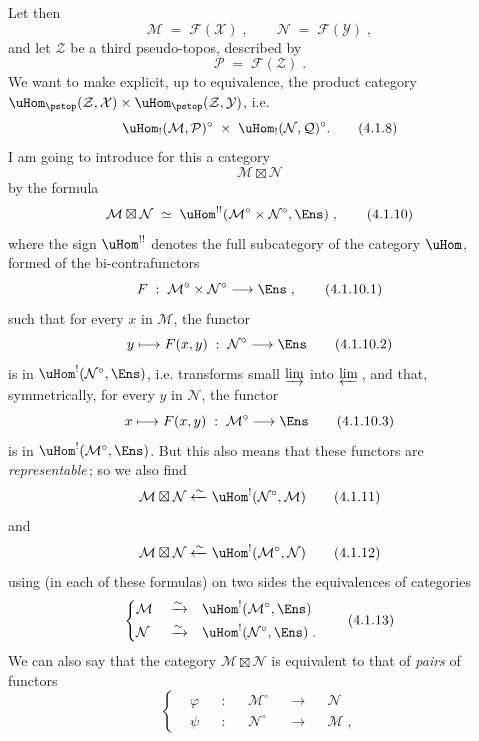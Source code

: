Let then
\[
\mathcal{M} \;=\; \mathcal{F}(\mathcal{X})\;, \qquad \mathcal{N} \;=\; \mathcal{F}(\mathcal{Y})\;,
\tag*{(4.1.6)}
\]
and let $\mathcal{Z}$ be a third pseudo-topos, described by
\[
\mathcal{P} \;=\; \mathcal{F}(\mathcal{Z})\;.
\tag*{(4.1.7)}
\]
We want to make explicit, up to equivalence, the product category $\uHom_{\pstop}(\mathcal{Z},\mathcal{X})\times\uHom_{\pstop}(\mathcal{Z},\mathcal{Y})$, i.e.
\[
\uHom_!(\mathcal{M},\mathcal{P})^\circ \;\times\; \uHom_!(\mathcal{N},\mathcal{Q})^\circ.
\tag*{(4.1.8)}
\] %
I am going to introduce for this a category
\[
\mathcal{M}\boxtimes\mathcal{N}
\tag*{(4.1.9)}
\]
by the formula
\[
\mathcal{M}\boxtimes\mathcal{N} \;\simeq\; \uHom^{!!}(\mathcal{M}^\circ\times\mathcal{N}^\circ,\Ens)\;,
\tag*{(4.1.10)}
\]
where the sign $\uHom^{!!}$ denotes the full subcategory of the category $\uHom$, formed of the bi-contrafunctors %
\[
F \;:\; \mathcal{M}^\circ\times\mathcal{N}^\circ \longrightarrow \Ens\;,
\tag*{(4.1.10.1)}
\]
such that for every $x$ in $\mathcal{M}$, the functor
\[
y \longmapsto F(x,y) \;:\; \mathcal{N}^\circ \longrightarrow \Ens
\tag*{(4.1.10.2)}
\]
is in $\uHom^!(\mathcal{N}^\circ,\Ens)$, i.e. transforms small $\varinjlim$ into $\varprojlim$\,, and that, symmetrically, for every $y$ in $\mathcal{N}$, the functor
\[
x \longmapsto F(x,y) \;:\; \mathcal{M}^\circ \longrightarrow \Ens
\tag*{(4.1.10.3)}
\]
is in $\uHom^!(\mathcal{M}^\circ,\Ens)$. But this also means that these functors are \textit{representable}\,; so we also find
\[
\mathcal{M}\boxtimes\mathcal{N} \xleftarrow{\sim} \uHom^!(\mathcal{N}^\circ,\mathcal{M})
\tag*{(4.1.11)}
\]
and
\[
\mathcal{M}\boxtimes\mathcal{N} \xleftarrow{\sim} \uHom^!(\mathcal{M}^\circ,\mathcal{N})
\tag*{(4.1.12)}
\]
using (in each of these formulas) on two sides the equivalences of categories
\[
\left\{
\begin{aligned}
&\mathcal{M} &&\xrightarrow{\sim} &&\uHom^!(\mathcal{M}^\circ,\Ens)\\
&\mathcal{N} &&\xrightarrow{\sim} &&\uHom^!(\mathcal{N}^\circ,\Ens)\;.
\end{aligned}
\right.
\tag*{(4.1.13)}
\]
We can also say that the category $\mathcal{M}\boxtimes\mathcal{N}$ is equivalent to that of \textit{pairs} of functors
\[
\left\{
\begin{aligned}
&\varphi &&: &&\mathcal{M}^\circ &&\longrightarrow &&\mathcal{N}\\
&\psi &&: &&\mathcal{N}^\circ &&\longrightarrow &&\mathcal{M}\;,
\end{aligned}
\right.
\tag*{(4.1.14)}
\]
